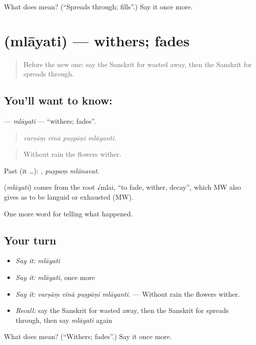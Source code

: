 \begin{tcolorbox}[breakable,colback=teal!4,colframe=teal!35!black,title={Before you move on}]
What does  mean? (\textquotedblleft{}Spreads through; fills\textquotedblright{}.) Say it once more.
\end{tcolorbox}
\section[\texorpdfstring{\sk{म्लायति} (mlāyati)}{म्लायति (mlāyati)}]{ (mlāyati) — withers; fades}

\label{lesson:SA-C303-mlayati}



\begin{quote}
Before the new one: say the Sanskrit for wasted away, then the Sanskrit for spreads through.
\end{quote}

\subsection*{You'll want to know: }
\textbf{} — \emph{mlāyati} — \textquotedblleft{}withers; fades\textquotedblright{}.

\begin{quote}
   
\end{quote}

\begin{quote}
\emph{varṣāṃ vinā puṣpāṇi mlāyanti.}
\end{quote}

\begin{quote}
Without rain the flowers wither.
\end{quote}

Past (it …):  , \emph{puṣpaṃ mlānavat}.

\begin{cousinweb}
\textbf{} (\emph{mlāyati}) comes from the root √mlai, \textquotedblleft{}to fade, wither, decay\textquotedblright{}, which MW also gives as to be languid or exhausted (MW).
\end{cousinweb}

\begin{grammarlens}[title={What you've built}]
One more word for telling what happened.
\end{grammarlens}

\subsection*{Your turn}
\begin{itemize}
\raggedright
  \item \emph{Say it:} \emph{mlāyati}
  \item \emph{Say it:} \emph{mlāyati}, once more
  \item \emph{Say it:} \emph{varṣāṃ vinā puṣpāṇi mlāyanti.} — Without rain the flowers wither.
  \item \emph{Recall:} say the Sanskrit for wasted away, then the Sanskrit for spreads through, then say \emph{mlāyati} again
\end{itemize}

\begin{tcolorbox}[breakable,colback=teal!4,colframe=teal!35!black,title={Before you move on}]
What does  mean? (\textquotedblleft{}Withers; fades\textquotedblright{}.) Say it once more.
\end{tcolorbox}
